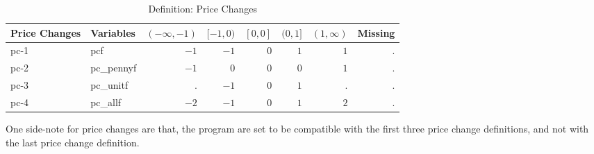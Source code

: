 \begin{table}[H]
	\caption{Definition: Price Changes}
	\begin{tabular}{l|l|rrrrrr}
		\hline\hline
		Price Changes & Variables  & $ (-\infty,-1) $ & $ [-1,0) $ & $ [0,0] $ & $ (0,1] $ & $ (1,\infty) $ & Missing \\ \hline\hline
		pc-1          & pcf        &           $ -1 $ &     $ -1 $ &     $ 0 $ &     $ 1 $ &          $ 1 $ &       . \\
		pc-2          & pc\_pennyf &           $ -1 $ &      $ 0 $ &     $ 0 $ &     $ 0 $ &          $ 1 $ &       . \\
		pc-3          & pc\_unitf  &                . &     $ -1 $ &     $ 0 $ &     $ 1 $ &              . &       . \\
		pc-4          & pc\_allf   &           $ -2 $ &     $ -1 $ &     $ 0 $ &     $ 1 $ &          $ 2 $ &       . \\ \hline\hline
	\end{tabular}
\end{table}

One side-note for price changes are that, the program are set to be compatible with the first three price change definitions, and not with the last price change definition.

